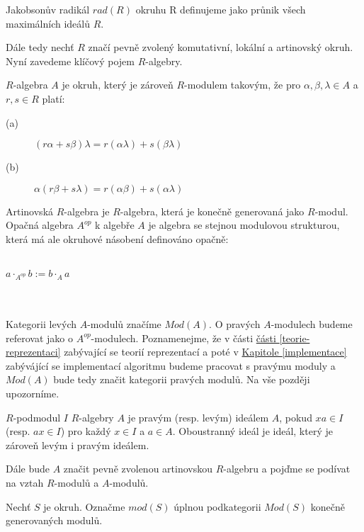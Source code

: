   \begin{dfn}
     Jakobsonův radikál $rad(R)$ okruhu R definujeme jako průnik všech 
     maximálních ideálů $R$.    
  \end{dfn}
  
    Dále tedy nechť $R$ značí pevně zvolený komutativní, lokální a artinovský okruh.
    Nyní zavedeme klíčový pojem $R$-algebry.
        
    \begin{dfn}
      $R$-algebra $A$ je okruh, který je zároveň $R$-modulem takovým, že pro 
      $\alpha,\beta,\lambda\in A$ a $r,s\in R$ platí:
      \begin{description}
        \item[(a)] $(r\alpha+s\beta)\lambda=r(\alpha\lambda)+s(\beta\lambda)$ 
        \item[(b)] $\alpha(r\beta+s\lambda)=r(\alpha\beta)+s(\alpha\lambda)$ 
      \end{description}      
      Artinovská $R$-algebra je $R$-algebra, která je konečně generovaná jako 
      $R$-modul.  
      Opačná algebra $A^{op}$ k algebře $A$ je algebra se stejnou 
      modulovou strukturou,  která má ale okruhové násobení definováno opačně: \\\\
      \centerline{$a\cdot_{A^{op}}b:=b\cdot_A a$}  \\\\
      Kategorii levých $A$-modulů značíme $Mod(A)$. O pravých $A$-modulech
      budeme referovat jako o $A^{op}$-modulech. 
      Poznamenejme, že v části \hyperref[teorie-reprezentaci]{části \ref*{teorie-reprezentaci}}  
      zabývající se teorií reprezentací a poté v 
      \hyperref[teorie-reprezentaci]{Kapitole \ref*{implementace}}  zabývájící se implementací algoritmu budeme pracovat s pravýmu 
      moduly a $Mod(A)$ bude tedy značit kategorii pravých modulů. Na vše později upozorníme.
      
      $R$-podmodul $I$ 
      $R$-algebry $A$ je pravým (resp. levým) ideálem $A$, pokud $xa\in I$ (resp. $ax\in I$)
      pro každý $x\in I$ a $a\in A$. Oboustranný ideál je ideál, který je 
      zároveň levým i pravým ideálem.  
    \end{dfn}
    
    Dále bude $A$ značit pevně zvolenou artinovskou $R$-algebru a pojďme se 
    podívat na vztah $R$-modulů a $A$-modulů.
        
    \begin{dfn}
      Nechť $S$ je okruh. Označme $mod(S)$ úplnou podkategorii $Mod(S)$ konečně 
      generovaných modulů.
    \end{dfn}
    
